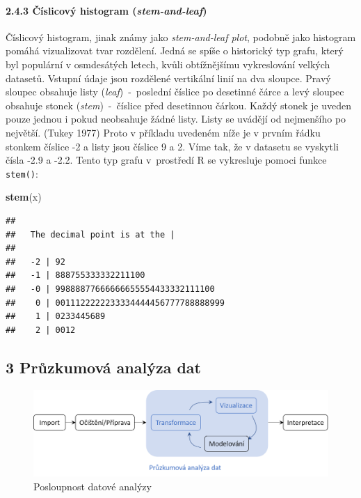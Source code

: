 \documentclass[12pt,]{article}
\newenvironment{Shaded}{\begin{snugshade}}{\end{snugshade}}
\newcommand{\KeywordTok}[1]{\textcolor[rgb]{0.13,0.29,0.53}{\textbf{#1}}}
\newcommand{\NormalTok}[1]{#1}
\let\oldparagraph\paragraph
\renewcommand{\paragraph}[1]{\oldparagraph{#1}\mbox{}}
\begin{document}
\hypertarget{stem-and-leaf}{\paragraph{\texorpdfstring{2.4.3 Číslicový
histogram
(\emph{stem-and-leaf})}{2.4.3 Číslicový histogram (stem-and-leaf)}}\label{stem-and-leaf}}

\qquad Číslicový histogram, jinak známy jako \emph{stem-and-leaf plot},
podobně jako histogram pomáhá vizualizovat tvar rozdělení. Jedná se
spíše o historický typ grafu, který byl populární v osmdesátých letech,
kvůli obtížnějšímu vykreslování velkých datasetů. Vstupní údaje jsou
rozdělené vertikální linií na dva sloupce. Pravý sloupec obsahuje listy
(\emph{leaf})~-~poslední číslice po desetinné čárce a levý sloupec
obsahuje stonek (\emph{stem})~-~číslice před desetinnou čárkou. Každý
stonek je uveden pouze jednou i pokud neobsahuje žádné listy. Listy se
uvádějí od nejmenšího po největší. (Tukey 1977) Proto v příkladu
uvedeném níže je v prvním řádku stonkem číslice -2 a listy jsou číslice
9 a 2. Víme tak, že v datasetu se vyskytli čísla -2.9 a -2.2. Tento typ
grafu v~prostředí R se vykresluje pomoci funkce \texttt{stem()}:

\begin{Shaded}
\begin{Highlighting}[]
\KeywordTok{stem}\NormalTok{(x)}
\end{Highlighting}
\end{Shaded}

\begin{verbatim}
## 
##   The decimal point is at the |
## 
##   -2 | 92
##   -1 | 888755333332211100
##   -0 | 99888877666666655554433332111100
##    0 | 0011122222233334444456777788888999
##    1 | 0233445689
##    2 | 0012
\end{verbatim}

\newpage

\hypertarget{EDA}{\subsection{3 Průzkumová analýza dat}\label{EDA}}

\begin{figure}[H]

{\centering \includegraphics[width=1\linewidth]{fig/EDA_diagram2} 

}

\caption{\label{fig:ch3.1} Posloupnost datové analýzy}\label{fig:diagram_img}
\end{figure}
\end{document}
